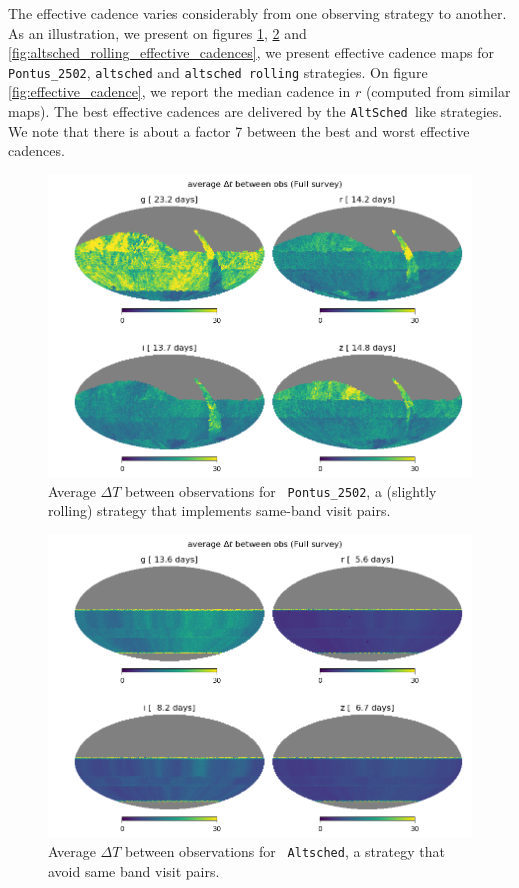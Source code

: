 \documentclass [11pt,a4paper]{article}
\newcommand{\altsched}{{\tt AltSched\ }}
\begin{document}
The effective cadence varies considerably from one observing strategy
to another.  As an illustration, we present on figures
\ref{fig:pontus_2502_effective_cadences},
\ref{fig:altsched_effective_cadences} and
\ref{fig:altsched_rolling_effective_cadences}, we present effective
cadence maps for {\tt Pontus\_2502}, {\tt altsched} and {\tt altsched
  rolling} strategies.  On figure \ref{fig:effective_cadence}, we
report the median cadence in $r$ (computed from similar maps).  The
best effective cadences are delivered by the \altsched like
strategies. We note that there is about a factor 7 between the best
and worst effective cadences.

\begin{figure}
  \begin{center}
    \includegraphics[width=0.8\linewidth]{Figures/pontus_2502_cadence.png}
    \caption{Average $\Delta T$ between observations for {\tt
        Pontus\_2502}, a (slightly rolling) strategy that implements
      same-band visit pairs. }
    \label{fig:pontus_2502_effective_cadences}
  \end{center}
\end{figure}


\begin{figure}
  \begin{center}
    \includegraphics[width=0.8\linewidth]{Figures/altsched_cadence.png}
    \caption{Average $\Delta T$ between observations for {\tt
        Altsched}, a strategy that avoid same band visit pairs.}
    \label{fig:altsched_effective_cadences}
  \end{center}
\end{figure}
\end{document}

